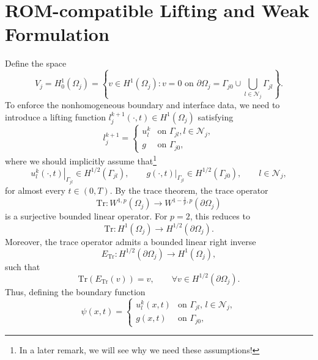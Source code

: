 \documentclass[a4paper, 11pt]{article}
\theoremstyle{remark}
\begin{document}
\section{ROM-compatible Lifting and Weak Formulation}
Define the space
\begin{equation*}
    V_{j} = H^{1}_{0}(\Omega_{j}) = \left\{v\in H^{1}(\Omega_{j}) : v = 0 \text{ on } \partial\Omega_{j} = \Gamma_{j0}\cup\bigcup_{l\in\mathcal{N}_{j}}\Gamma_{jl}\right\}.
\end{equation*}
To enforce the nonhomogeneous boundary and interface data, we need to introduce a lifting function $l_{j}^{k+1}(\cdot, t)\in H^{1}(\Omega_{j})$ satisfying
\begin{equation*}
    l_{j}^{k+1} = 
    \begin{cases}
        u_{l}^{k} & \text{on } \Gamma_{jl},l\in \mathcal{N}_{j},\\
        g & \text{on } \Gamma_{j0},
    \end{cases}
\end{equation*}
where we should implicitly assume that\footnote{In a later remark, we will see why we need these assumptions!}
\begin{equation*}
    \left.u_{l}^{k}(\cdot, t) \right|_{\Gamma_{jl}}\in H^{1/2}(\Gamma_{jl}), \qquad \left.g(\cdot, t)\right|_{\Gamma_{jl}} \in H^{1/2}(\Gamma_{j0}), \qquad l\in \mathcal{N}_{j},
\end{equation*}
for almost every $t\in (0, T)$. By the trace theorem, the trace operator
\begin{equation*}
    \text{Tr}: W^{1, p}(\Omega_{j}) \to W^{1-\frac{1}{p}, p}(\partial\Omega_{j})
\end{equation*}
is a surjective bounded linear operator. For $p=2$, this reduces to
\begin{equation*}
    \text{Tr}: H^{1}(\Omega_{j}) \to H^{1/2}(\partial\Omega_{j}).
\end{equation*}
Moreover, the trace operator admits a bounded linear right inverse\begin{equation*}
    E_{\text{Tr}}: H^{1/2}(\partial\Omega_{j})\to H^1(\Omega_{j}),
\end{equation*}
such that
\begin{equation*}
    \text{Tr}(E_{\text{Tr}}(v)) = v, \qquad \forall v\in H^{1/2}(\partial\Omega_{j}).
\end{equation*}
Thus, defining the boundary function
\begin{equation*}
    \psi(x, t) = 
    \begin{cases}
        u_{l}^{k}(x, t) & \text{on } \Gamma_{jl}, \,l\in \mathcal{N}_{j},\\
        g(x, t) & \text{on } \Gamma_{j0},
    \end{cases}
\end{equation*}
\end{document}
